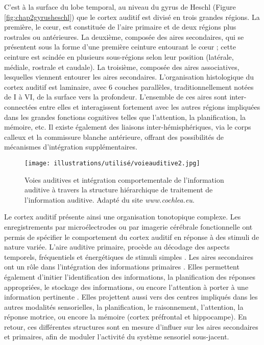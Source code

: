 C'est à la surface du lobe temporal, au niveau du gyrus de Heschl (Figure \ref{fig:chap2gyrusheschl}) que le cortex auditif est divisé en trois grandes régions. 
La première, le cœur, est constituée de l’aire primaire et de deux régions plus rostrales ou antérieures. 
La deuxième, composée des aires secondaires, qui se présentent sous la forme d’une première ceinture entourant le cœur ; cette ceinture est scindée en plusieurs sous-régions selon leur position (latérale, médiale, rostrale et caudale). 
La troisième, composée des aires associatives, lesquelles viennent entourer les aires secondaires. 
L’organisation histologique du cortex auditif est laminaire, avec 6 couches parallèles, traditionnellement notées de I à VI, de la surface vers la profondeur. 
L’ensemble de ces aires sont inter-connectées entre elles et interagissent fortement avec les autres régions impliquées dans les grandes fonctions cognitives telles que l’attention, la planification, la mémoire, etc. 
Il existe également des liaisons inter-hémisphériques, via le corps calleux et la commissure blanche antérieure, offrant des possibilités de mécanismes d’intégration supplémentaires. 

\begin{figure*}[!t]
\center
\texttt{[image: illustrations/utilisé/voieauditive2.jpg]}
\caption[Intégration comportementale de l'information auditive]{Voies auditives et intégration comportementale de l'information auditive à travers la structure hiérarchique de traitement de l'information auditive. Adapté du site \textit{www.cochlea.eu}.}
\label{fig:chap2voieauditive2}
\end{figure*}

Le cortex auditif présente ainsi une organisation tonotopique complexe. 
Les enregistrements par microélectrodes ou par imagerie cérébrale fonctionnelle ont permis de spécifier le comportement du cortex auditif en réponse à des stimuli de nature variée. 
L’aire auditive primaire, procède au décodage des aspects temporels, fréquentiels et énergétiques de stimuli simples \citep{recanzone1993plasticity, riecke2007hearing, steinschneider2008spectrotemporal}. 
Les aires secondaires ont un rôle dans l'intégration des informations primaires \citep{rauschecker1995processing}. 
Elles permettent également d'initier l’identification des informations, la planification des réponses appropriées, le stockage des informations, ou encore l’attention à porter à une information pertinente \citep{riecke2009hearing}. 
Elles projettent aussi vers des centres impliqués dans les autres modalités sensorielles, la planification, le raisonnement, l’attention, la réponse motrice, ou encore la mémoire (cortex préfrontal et hippocampe). 
En retour, ces différentes structures sont en mesure d’influer sur les aires secondaires et primaires, afin de moduler l’activité du système sensoriel sous-jacent. 

